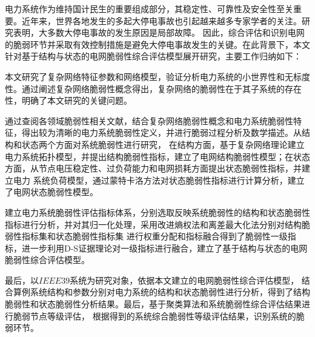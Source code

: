 \begin{cabstract}
电力系统作为维持国计民生的重要组成部分，其稳定性、可靠性及安全性至关重要。近年来，世界各地发生的多起大停电事故也引起越来越多专家学者的关注。研究表明，大多数大停电事故的发生原因是局部故障。
因此，综合评估和识别电网的脆弱环节并采取有效控制措施是避免大停电事故发生的关键。在此背景下，本文针对基于结构与状态的电网脆弱性综合评估模型展开研究，主要工作归纳如下：


本文研究了复杂网络特征参数和网络模型，验证分析电力系统的小世界性和无标度性。通过阐述复杂网络脆弱性概念得出，复杂网络的脆弱性在于其子系统的存在性，明确了本文研究的关键问题。

通过查阅各领域脆弱性相关文献，结合复杂网络脆弱性概念和电力系统脆弱性特征，得出较为清晰的电力系统脆弱性定义，并进行脆弱过程分析及数学描述。从结构和状态两个方面对系统脆弱性进行研究，
在结构方面，基于复杂网络理论建立电力系统拓扑模型，并提出结构脆弱性指标，建立了电网结构脆弱性模型；在状态方面，从节点电压稳定性、过负荷能力和电网损耗方面提出状态脆弱性指标，并建立电力
系统负荷模型，通过蒙特卡洛方法对状态脆弱性指标进行计算分析，建立了电网状态脆弱性模型。

建立电力系统脆弱性评估指标体系，分别选取反映系统脆弱性的结构和状态脆弱性指标进行分析，并对其归一化处理，采用改进熵权法和离差最大化法分别对结构脆弱性指标集和状态脆弱性指标集
进行权重分配和指标融合得到了脆弱性一级指标，进一步利用D-S证据理论对一级指标进行融合，建立了基于结构与状态的电网脆弱性综合评估模型。

最后，以$IEEE39$系统为研究对象，依据本文建立的电网脆弱性综合评估模型，
结合算例系统结构和参数分别对电力系统的结构和状态脆弱性进行分析，得到了结构脆弱性和状态脆弱性分析结果。最后，基于聚类算法和系统脆弱性综合评估结果进行脆弱节点等级评估，
根据得到的系统综合脆弱性等级评估结果，识别系统的脆弱环节。
\end{cabstract}


\begin{eabstract}

\end{eabstract}

\ekeywords{} 